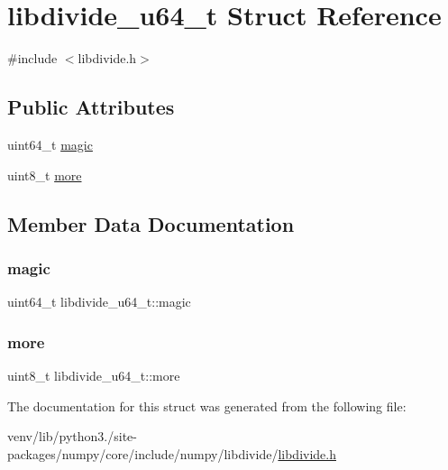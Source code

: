 \hypertarget{structlibdivide__u64__t}{}\section{libdivide\+\_\+u64\+\_\+t Struct Reference}
\label{structlibdivide__u64__t}


{\ttfamily \#include $<$libdivide.\+h$>$}

\subsection*{Public Attributes}
\begin{DoxyCompactItemize}
\item 
uint64\+\_\+t \hyperlink{structlibdivide__u64__t_aa302bbfb8b5601b995bed154fd51f5d1}{magic}
\item 
uint8\+\_\+t \hyperlink{structlibdivide__u64__t_a37d3f9421a54b28d76d5541ec36a74f1}{more}
\end{DoxyCompactItemize}


\subsection{Member Data Documentation}
\mbox{\label{structlibdivide__u64__t_aa302bbfb8b5601b995bed154fd51f5d1}} 
\subsubsection{\texorpdfstring{magic}{magic}}
{\footnotesize\ttfamily uint64\+\_\+t libdivide\+\_\+u64\+\_\+t\+::magic}

\mbox{\label{structlibdivide__u64__t_a37d3f9421a54b28d76d5541ec36a74f1}} 
\subsubsection{\texorpdfstring{more}{more}}
{\footnotesize\ttfamily uint8\+\_\+t libdivide\+\_\+u64\+\_\+t\+::more}



The documentation for this struct was generated from the following file\+:\begin{DoxyCompactItemize}
\item 
venv/lib/python3./site-\/packages/numpy/core/include/numpy/libdivide/\hyperlink{libdivide_8h}{libdivide.\+h}\end{DoxyCompactItemize}
